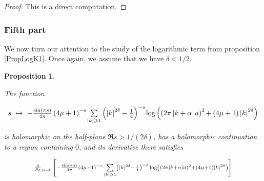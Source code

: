 \documentclass{jams-l}
\newtheorem{proposition}[theorem]{Proposition}
\theoremstyle{definition}
\theoremstyle{remark}
\numberwithin{equation}{section}
\begin{document}
            \begin{proof}
            
                This is a direct computation.
            
            \end{proof}
            
            
        \subsubsection*{\textbf{Fifth part}}
        \label{AFifthPart}
            
            We now turn our attention to the study of the logarithmic term from proposition \ref{PropLogK1}. Once again, we assume that we have $\delta < 1/2$.
            
            \begin{proposition}
            \label{PropA5}
            
                The function
                
                \[ \begin{array}{lll}
                        s & \hspace{-4pt} \mapsto & \hspace{-4pt} - \frac{\sin \left(\pi s \right)}{4 \pi} \left( 4 \mu + 1 \right)^{-s} \hspace{-1pt} \sum\limits_{\left \vert k \right \vert \geqslant 1} \left( \left \vert k \right \vert^{2 \delta} - \frac{1}{4} \right)^{-s} \hspace{-1pt} \log \left( \left( 2 \pi \left \vert k + \alpha \right \vert a \right)^2 \hspace{-1pt} + \left( 4 \mu + 1 \right) \left \vert k \right \vert^{2 \delta} \right)
                    \end{array} \]
                
                \noindent is holomorphic on the half-plane $\Re s > 1/\left( 2 \delta \right)$, has a holomorphic continuation to a region containing $0$, and its derivative there satisfies
                
                \[ \begin{array}{lll}
                        \multicolumn{3}{l}{\scriptstyle \frac{\partial}{\partial s}_{\left \vert s = 0 \right.}  \left[ - \frac{\sin \left(\pi s \right)}{4 \pi} \left( 4 \mu + 1 \right)^{-s} \sum\limits_{\left \vert k \right \vert \geqslant 1} \left( \left \vert k \right \vert^{2 \delta} - \frac{1}{4} \right)^{-s} \log \left( \left( 2 \pi \left \vert k + \alpha \right \vert a \right)^2 + \left( 4 \mu + 1 \right) \left \vert k \right \vert^{2 \delta} \right) \right]} \\[1em]
                        

\end{array}\]
\end{proposition}
\end{document}
